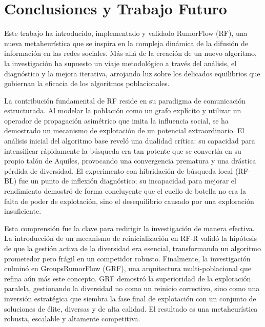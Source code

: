 \documentclass[11pt,a4paper]{article}
\begin{document}
\section{Conclusiones y Trabajo Futuro}

Este trabajo ha introducido, implementado y validado RumorFlow (RF), una nueva metaheurística que se inspira en la compleja dinámica de la difusión de información en las redes sociales. Más allá de la creación de un nuevo algoritmo, la investigación ha supuesto un viaje metodológico a través del análisis, el diagnóstico y la mejora iterativa, arrojando luz sobre los delicados equilibrios que gobiernan la eficacia de los algoritmos poblacionales.

La contribución fundamental de RF reside en su paradigma de comunicación estructurada. Al modelar la población como un grafo explícito y utilizar un operador de propagación asimétrico que imita la influencia social, se ha demostrado un mecanismo de explotación de un potencial extraordinario. El análisis inicial del algoritmo base reveló una dualidad crítica: su capacidad para intensificar rápidamente la búsqueda era tan potente que se convertía en su propio talón de Aquiles, provocando una convergencia prematura y una drástica pérdida de diversidad. El experimento con hibridación de búsqueda local (RF-BL) fue un punto de inflexión diagnóstico; su incapacidad para mejorar el rendimiento demostró de forma concluyente que el cuello de botella no era la falta de poder de explotación, sino el desequilibrio causado por una exploración insuficiente.

Esta comprensión fue la clave para redirigir la investigación de manera efectiva. La introducción de un mecanismo de reinicialización en RF-R validó la hipótesis de que la gestión activa de la diversidad era esencial, transformando un algoritmo prometedor pero frágil en un competidor robusto. Finalmente, la investigación culminó en GroupsRumorFlow (GRF), una arquitectura multi-poblacional que refina aún más este concepto. GRF demostró la superioridad de la exploración paralela, gestionando la diversidad no como un reinicio correctivo, sino como una inversión estratégica que siembra la fase final de explotación con un conjunto de soluciones de élite, diversas y de alta calidad. El resultado es una metaheurística robusta, escalable y altamente competitiva.
\end{document}
